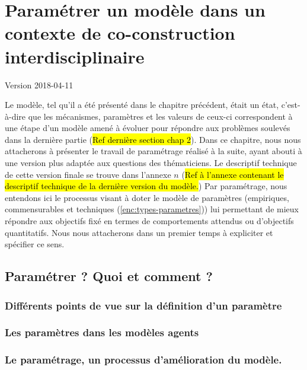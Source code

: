 \documentclass[12pt, a4paper, oneside]{book}
\begin{document}
	\setcounter{part}{0}
	\setcounter{chapter}{2}
	\setcounter{secnumdepth}{3}
		
	\chapter{Paramétrer un modèle dans un contexte de co-construction interdisciplinaire}
	\begin{center}
		{\large Version 2018-04-11}
	\end{center}

	Le modèle, tel qu'il a été présenté dans le chapitre précédent, était un \og état\fg{}, c'est-à-dire que les mécanismes, paramètres et les valeurs de ceux-ci correspondent à une étape d'un modèle amené à évoluer pour répondre aux problèmes soulevés dans la dernière partie (\hl{Ref dernière section chap 2}).
	Dans ce chapitre, nous nous attacherons à présenter le travail de paramétrage réalisé à la suite, ayant abouti à une version plus adaptée aux questions des thématiciens. Le descriptif technique de cette version \og finale\fg{} se trouve dans l'annexe $n$ (\hl{Ref à l'annexe contenant le descriptif technique de la dernière version du modèle.})
	Par paramétrage, nous entendons ici le processus visant à doter le modèle de paramètres (empiriques, \og commensurables\fg{} et techniques (\cref{enc:types-parametres})) lui permettant de mieux répondre aux objectifs fixé en termes de comportements attendus ou d'objectifs quantitatifs. Nous nous attacherons dans un premier temps à expliciter et spécifier ce sens.
	

%	
	\section{Paramétrer ? Quoi et comment ?}
	\subsection{Différents points de vue sur la définition d'un paramètre}
	\subsection{Les paramètres dans les modèles agents}
	\subsection{Le paramétrage, un processus d'amélioration du modèle.}
\end{document}
